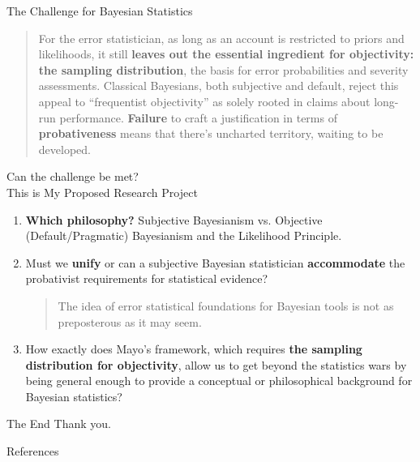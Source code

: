 \documentclass{beamer}
\begin{document}
	\begin{frame}{The Challenge for Bayesian Statistics}
	\begin{quote}
For the error statistician, as long as an account is restricted to priors and likelihoods, it still \textbf{leaves out the essential ingredient for objectivity: the sampling distribution}, the basis for error probabilities and severity assessments. Classical Bayesians, both subjective and default, reject this appeal to ``frequentist objectivity'' as solely rooted in claims about long-run performance. \textbf{Failure} to craft a justification in terms of \textbf{probativeness} means that there's uncharted territory, waiting to be developed.

\citet[231]{Mayo2018}
\end{quote}
	\end{frame}

	
	\begin{frame}{Can the challenge be met? \\
	This is My Proposed Research Project}
	
	\begin{enumerate}
	
	\item \textbf{Which philosophy?} Subjective Bayesianism vs. Objective (Default/Pragmatic) Bayesianism and the Likelihood Principle. 
	\vfill
	\item Must we \textbf{unify} or can a subjective Bayesian statistician \textbf{accommodate} the probativist requirements for statistical evidence? 
	\vfill
	\begin{quote}
	The idea of error statistical foundations for Bayesian tools is not as preposterous as it may seem. \citep[28 -- 29]{Mayo2018}
	\end{quote}
	
	\vfill
	\item How exactly does Mayo's framework, which requires \textbf{the sampling distribution for objectivity}, allow us to get beyond the statistics wars by being general enough to provide a conceptual or philosophical background for Bayesian statistics?
	
	\end{enumerate}
	
	\end{frame}

\begin{frame}[focus]{The End}
        Thank you.
\end{frame}

\appendix
    \begin{frame}{References}
        
		
    \end{frame}
    
\end{document}
